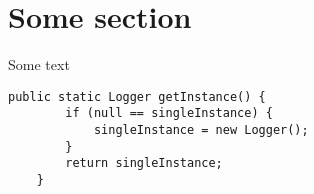 
	\section{Some section}
Some text

\begin{lstlisting}[style=CodeHighlighting]
public static Logger getInstance() {
        if (null == singleInstance) {
            singleInstance = new Logger();
        }
        return singleInstance;
    }
\end{lstlisting}